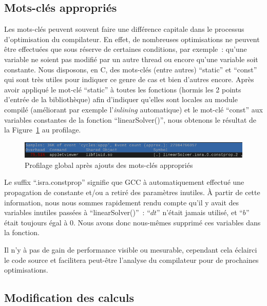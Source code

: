 \documentclass[12pt,a4paper]{article}
\begin{document}
\subsection{Mots-clés appropriés}
\label{sub.optim.keywords}

Les mots-clés peuvent souvent faire une différence capitale dans le processus
d'optimisation du compilateur. En effet, de nombreuses optimisations ne peuvent
être effectuées que sous réserve de certaines conditions, par exemple : qu'une
variable ne soient pas modifié par un autre thread ou encore qu'une variable
soit constante. Nous disposons, en C, des mots-clés (entre autres)
\enquote{static} et \enquote{const} qui sont très utiles pour indiquer ce genre
de cas et bien d'autres encore. Après avoir appliqué le mot-clé \enquote{static}
à toutes les fonctions (hormis les 2 points d'entrée de la bibliothèque) afin
d'indiquer qu'elles sont locales au module compilé (améliorant par exemple
l'\textit{inlining} automatique) et le mot-clé \enquote{const} aux variables
constantes de la fonction \enquote{linearSolver()}, nous obtenons le résultat de
la Figure~\ref{fig.optim.keywords.global} au profilage.

\begin{figure}
    \centering
    \includegraphics[scale=0.55]{figures/optims/keywords/global.png}
    \caption{Profilage global après ajouts des mots-clés appropriés}
    \label{fig.optim.keywords.global}
\end{figure}

Le suffix \enquote{.isra.constprop} signifie que \ac{GCC} à automatiquement
effectué une propagation de constante et/ou a retiré des paramètres inutiles. À
partir de cette information, nous nous sommes rapidement rendu compte qu'il y
avait des variables inutiles passées à \enquote{linearSolver()} : \enquote{$dt$}
n'était jamais utilisé, et \enquote{$b$} était toujours égal à 0. Nous avons
donc nous-mêmes supprimé ces variables dans la fonction.

Il n'y à pas de gain de performance visible ou mesurable, cependant cela
éclairci le code source et facilitera peut-être l'analyse du compilateur pour de
prochaines optimisations. 

\subsection{Modification des calculs}
\label{sub.optim.cacl}
\end{document}
